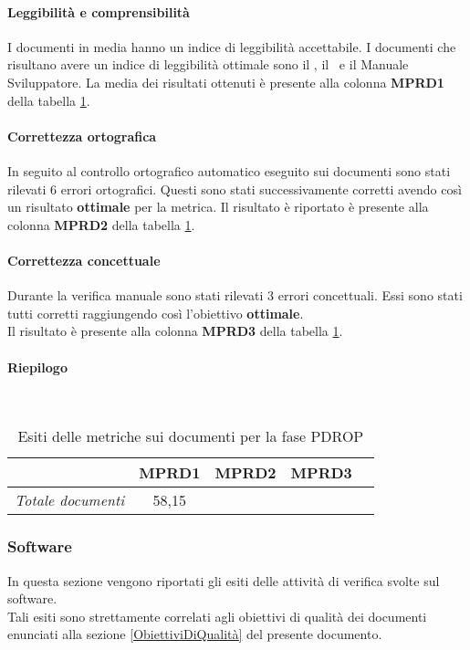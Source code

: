 \documentclass[../PianoDiQualifica.tex]{subfiles}
\begin{document}
\begin{appendices}
			\paragraph{Leggibilità e comprensibilità}
			I documenti in media hanno un indice di leggibilità accettabile. I documenti che risultano avere un indice di leggibilità ottimale sono il \glossario, il \manualeutente\ e il Manuale Sviluppatore.
			La media dei risultati ottenuti è presente alla colonna \textbf{MPRD1} della tabella \ref{tab:esiti_metriche_sui_documenti}. 
			
			\paragraph{Correttezza ortografica}
			In seguito al controllo ortografico automatico eseguito sui documenti sono stati rilevati 6 errori ortografici. Questi sono stati successivamente corretti avendo così un risultato \textbf{ottimale} per la metrica.
			Il risultato è riportato è presente alla colonna \textbf{MPRD2} della tabella \ref{tab:esiti_metriche_sui_documenti}.  
			
			
			\paragraph{Correttezza concettuale}
			 Durante la verifica manuale sono stati rilevati 3 errori concettuali. Essi sono stati tutti corretti raggiungendo così l'obiettivo \textbf{ottimale}.\\
			 Il risultato è presente alla colonna \textbf{MPRD3} della tabella \ref{tab:esiti_metriche_sui_documenti}.  
			
			\paragraph{Riepilogo}\
			\begin{table}[H]
				\centering
				\begin{tabular}{l * {4}{c}}
					\toprule
					  & \textbf{MPRD1} & \textbf{MPRD2} & \textbf{MPRD3}\\
					\midrule
					\textit{Totale documenti} & 58,15 & \color{dkgreen}{0\%} & \color{dkgreen}{0\%} \\
					\bottomrule
				\end{tabular}
				\caption{Esiti delle metriche sui documenti per la fase PDROP}
				\label{tab:esiti_metriche_sui_documenti}
			\end{table}
			
			
		\subsubsection{Software}
		In questa sezione vengono riportati gli esiti delle attività di verifica svolte sul software.\\
		Tali esiti sono strettamente correlati agli obiettivi di qualità dei documenti enunciati alla sezione \ref{ObiettiviDiQualità} del presente documento.
		

\end{appendices}
\end{document}
